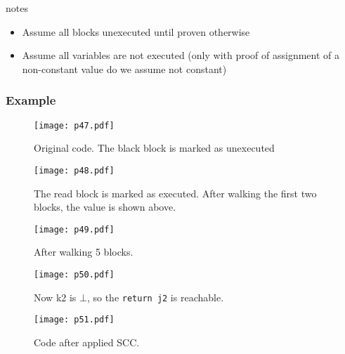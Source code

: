 \begin{note}{notes}
\begin{itemize}
    \item Assume all blocks unexecuted until proven otherwise
    \item Assume all variables are not executed (only with proof of assignment of a non-constant value do we assume not constant)
\end{itemize}
\end{note}

\subsubsection{Example}

\begin{figure}[H]
    \centering
     \texttt{[image: p47.pdf]}
         \caption{Original code. The black block is marked as unexecuted}
         \label{fig:p47}

\end{figure}




\begin{figure}[H]
    \centering
     \texttt{[image: p48.pdf]}
         \caption{The read block is marked as executed. After walking the first two blocks, the value is shown above.}
         \label{fig:p48}

\end{figure}



\begin{figure}[H]
    \centering
     \texttt{[image: p49.pdf]}
         \caption{After walking 5 blocks.}
         \label{fig:p49}

\end{figure}



\begin{figure}[H]
    \centering
     \texttt{[image: p50.pdf]}
         \caption{Now k2 is $\bot$, so the \texttt{return j2} is reachable.}
         \label{fig:p50}

\end{figure}



\begin{figure}[H]
    \centering
     \texttt{[image: p51.pdf]}
         \caption{Code after applied SCC.}
         \label{fig:p51}

\end{figure}


